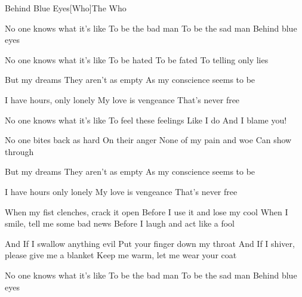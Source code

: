 \begin{Song}{Behind Blue Eyes}[Who]{The Who}
\begin{multicols}{2}

\begin{Verse}
No one knows what it's like
To be the bad man
To be the sad man
Behind blue eyes
\espaceInterStrophe

No one knows what it's like
To be hated
To be fated
To telling only lies
\end{Verse}
\espaceInterStrophe

\begin{Chorus}
But my dreams
They aren't as empty
As my conscience seems to be
\espaceInterStrophe

I have hours, only lonely
My love is vengeance
That's never free
\end{Chorus}
\espaceInterStrophe

\begin{Verse}
No one knows what it's like
To feel these feelings
Like I do
And I blame you!
\espaceInterStrophe

No one bites back as hard
On their anger
None of my pain and woe
Can show through
\end{Verse}
\columnbreak

\begin{Chorus}
But my dreams
They aren't as empty
As my conscience seems to be
\espaceInterStrophe

I have hours only lonely
My love is vengeance
That's never free
\end{Chorus}
\espaceInterStrophe

\begin{Bridge}
When my fist clenches, crack it open
Before I use it and lose my cool
When I smile, tell me some bad news
Before I laugh and act like a fool
\espaceInterStrophe

And If I swallow anything evil
Put your finger down my throat
And If I shiver, please give me a blanket
Keep me warm, let me wear your coat
\end{Bridge}
\espaceInterStrophe

\begin{Verse}
No one knows what it's like
To be the bad man
To be the sad man
Behind blue eyes
\end{Verse}
\vfill
~
\end{multicols}

\vfill

\begin{multicols}{2}


\end{multicols}
\end{Song}

